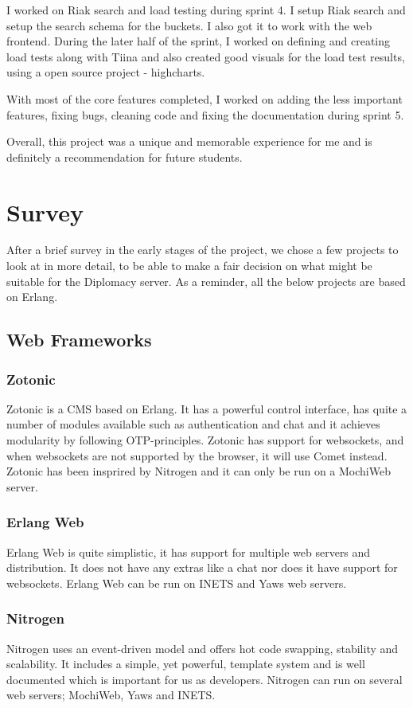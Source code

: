 \documentclass[11pt,a4paper]{report}
\begin{document}
I worked on Riak search and load testing during sprint 4. I setup Riak search and setup the search schema for the buckets. I also got it to work with the web frontend. During the later half of the sprint, I worked on defining and creating load tests along with Tiina and also created good visuals for the load test results, using a open source project - highcharts.

With most of the core features completed, I worked on adding the less important features, fixing bugs, cleaning code and fixing the documentation during sprint 5.

Overall, this project was a unique and memorable experience for me and is definitely a recommendation for future students.

\chapter{Survey}
After a brief survey in the early stages of the project, we chose a few projects to look at in more detail, to be able to make a fair decision on what might be suitable for the Diplomacy server. As a reminder, all the below projects are based on Erlang.

\section{Web Frameworks}
\subsection{Zotonic}
Zotonic\cite{zotonic} is a CMS based on Erlang. It has a powerful control interface, has
quite a number of modules available such as authentication and chat and it
achieves modularity by following OTP-principles. Zotonic has support for
websockets, and when websockets are not supported by the browser, it will use
Comet instead. Zotonic has been insprired by Nitrogen and it can only be run
on a MochiWeb server.

\subsection{Erlang Web}
Erlang Web\cite{erlangweb} is quite simplistic, it has support for multiple web servers and
distribution. It does not have any extras like a chat nor does it have support
for websockets. Erlang Web can be run on INETS and Yaws web servers.

\subsection{Nitrogen}
Nitrogen\cite{nitrogen} uses an event-driven model and offers hot code swapping, stability
and scalability. It includes a simple, yet powerful, template system and is
well documented which is important for us as developers. Nitrogen can run on
several web servers; MochiWeb, Yaws and INETS.
\end{document}
